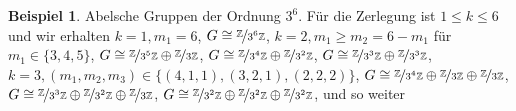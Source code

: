 \documentclass[12pt]{scrartcl} %
\newcommand\Z{\mathbb{Z}}
\theoremstyle{definition}
\newtheorem{ex}{Beispiel}
\theoremstyle{remark}
\begin{document}
\begin{ex}
	Abelsche Gruppen der Ordnung $3^6$. Für die Zerlegung ist $1\leq k\leq 6$ und wir erhalten
	$k=1,m_1=6$, $G\cong\nicefrac{\Z}{3^6\Z}$,
	$k=2,m_1\geq m_2=6-m_1$ für $m_1\in\{3,4,5\}$, $G\cong\nicefrac{\Z}{3^5\Z}\oplus\nicefrac{\Z}{3\Z}$, $G\cong\nicefrac{\Z}{3^4\Z}\oplus\nicefrac{\Z}{3^2\Z}$, $G\cong\nicefrac{\Z}{3^3\Z}\oplus\nicefrac{\Z}{3^3\Z}$,
	$k=3,(m_1,m_2,m_3)\in\{(4,1,1),(3,2,1),(2,2,2)\}$, $G\cong\nicefrac{\Z}{3^4\Z}\oplus\nicefrac{\Z}{3\Z}\oplus\nicefrac{\Z}{3\Z}$, $G\cong\nicefrac{\Z}{3^3\Z}\oplus\nicefrac{\Z}{3^2\Z}\oplus\nicefrac{\Z}{3\Z}$, $G\cong\nicefrac{\Z}{3^2\Z}\oplus\nicefrac{\Z}{3^2\Z}\oplus\nicefrac{\Z}{3^2\Z}$, und so weiter %
\end{ex}
\end{document}
